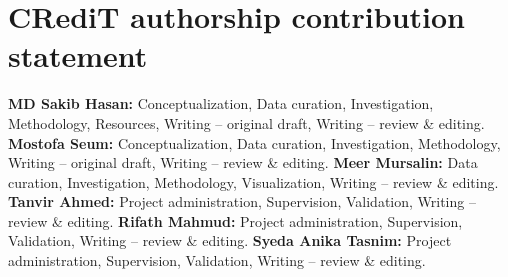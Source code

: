 \documentclass[a4paper,fleqn]{cas-sc}
\begin{document}
\section*{CRediT authorship contribution statement}
\textbf{MD Sakib Hasan:} Conceptualization, Data curation, Investigation, Methodology, Resources, Writing -- original draft, Writing -- review \& editing. \textbf{Mostofa Seum:} Conceptualization, Data curation, Investigation, Methodology, Writing -- original draft, Writing -- review \& editing. \textbf{Meer Mursalin:} Data curation, Investigation, Methodology, Visualization, Writing -- review \& editing. \textbf{Tanvir Ahmed:} Project administration, Supervision, Validation, Writing -- review \& editing. \textbf{Rifath Mahmud:} Project administration, Supervision, Validation, Writing -- review \& editing. \textbf{Syeda Anika Tasnim:} Project administration, Supervision, Validation, Writing -- review \& editing.

\appendix
\renewcommand{\theHfigure}{appendix.\arabic{figure}}


\clearpage


\end{document}
